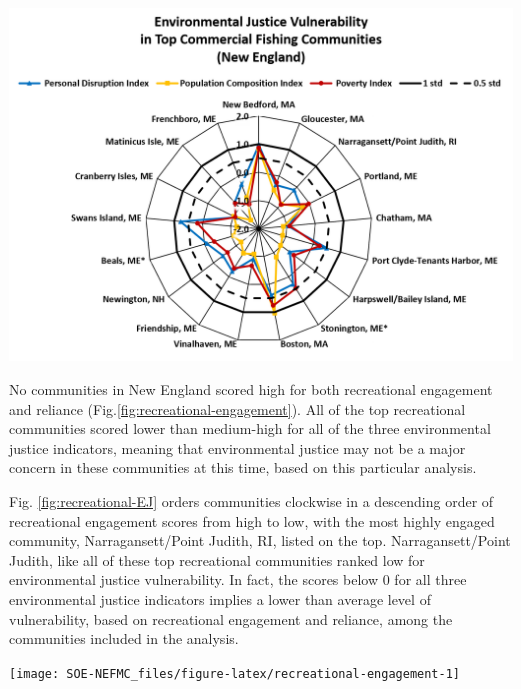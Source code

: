 \documentclass[
  10pt,
]{article}
\let\origfigure\figure
\let\endorigfigure\endfigure
\renewenvironment{figure}[1][2] {
    \expandafter\origfigure\expandafter[H]
} {
    \endorigfigure
}
\begin{document}
\begin{figure}

{\centering \includegraphics[width=0.75\linewidth]{SOE-NEFMC_files/figure-latex/commercial-EJ-1} 

}

\caption{Environmental justice indicators (Poverty Index, population composition index, and personal disruption index) for top commercial fishing communities in New England. *Community scored high (1.00 and above) for both commercial engagement and reliance indicators.}\label{fig:commercial-EJ}
\end{figure}

No communities in New England scored high for both recreational engagement and reliance (Fig.\ref{fig:recreational-engagement}). All of the top recreational communities scored lower than medium-high for all of the three environmental justice indicators, meaning that environmental justice may not be a major concern in these communities at this time, based on this particular analysis.

Fig. \ref{fig:recreational-EJ} orders communities clockwise in a descending order of recreational engagement scores from high to low, with the most highly engaged community, Narragansett/Point Judith, RI, listed on the top. Narragansett/Point Judith, like all of these top recreational communities ranked low for environmental justice vulnerability. In fact, the scores below 0 for all three environmental justice indicators implies a lower than average level of vulnerability, based on recreational engagement and reliance, among the communities included in the analysis.

\begin{figure}

{\centering \texttt{[image: SOE-NEFMC\_files/figure-latex/recreational-engagement-1]} 

}

\caption{Recreational engagement and reliance, and environmental justice vulnerability, for the top recreationally engaged and reliant fishing communities in New England. None of these communities ranked medium-high or above for one or more of the environmental justice indicators.}\label{fig:recreational-engagement}
\end{figure}
\end{document}
